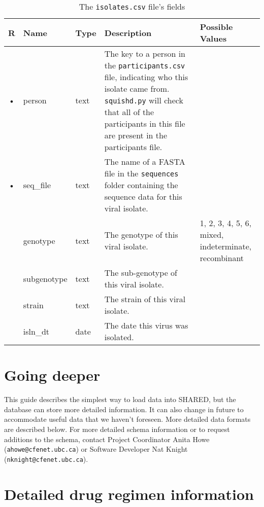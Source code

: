 \documentclass{article}
\begin{document}
\begin{table}
  \centering
  \caption{The \texttt{isolates.csv} file's fields}
  \label{tbl:isolates.csv}
  \begin{tabular}{cllp{6cm}p{4cm}}
    R & Name        & Type      & Description & Possible Values\\ \hline
    • & person      & text    & The key to a person in the
    \texttt{participants.csv} file, indicating who this isolate came
    from. \texttt{squishd.py} will check that all of the participants
    in this file are present in the participants file. & \\
    
    • & seq\_file   & text    & The name of a FASTA file in the
    \texttt{sequences} folder containing the sequence data for this viral isolate. & \\ 
      & genotype    & text    & The genotype of this viral isolate. &
    1, 2, 3, 4, 5, 6, mixed, indeterminate, recombinant \\
      & subgenotype & text    & The sub-genotype of this viral isolate. & \\
      & strain      & text    & The strain of this viral isolate. & \\
      & isln\_dt    & date      & The date this virus was isolated. & \\
    
  \end{tabular}
\end{table}


\section{Going deeper}

This guide describes the simplest way to load data into SHARED, but
the database can store more detailed information. It can also change
in future to accommodate useful data that we haven't foreseen. More
detailed data formats are described below. For more detailed schema
information or to request additions to the schema, contact Project
Coordinator Anita Howe (\texttt{ahowe@cfenet.ubc.ca}) or Software
Developer Nat Knight (\texttt{nknight@cfenet.ubc.ca}).


\newpage
\appendix

\section{Detailed drug regimen information}
\label{apx:drug-regimens}
\end{document}
